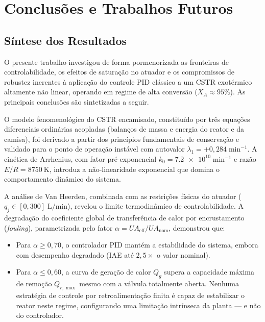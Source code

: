 \chapter{Conclusões e Trabalhos Futuros}
\label{cap:conclusoes}

\section{Síntese dos Resultados}
\label{sec:sintese_resultados}

O presente trabalho investigou de forma pormenorizada as fronteiras de controlabilidade, os efeitos de saturação no atuador e os compromissos de robustez inerentes à aplicação do controle PID clássico a um CSTR exotérmico altamente não linear, operando em regime de alta conversão ($X_A \approx 95\%$). As principais conclusões são sintetizadas a seguir.

O modelo fenomenológico do CSTR encamisado, constituído por três equações diferenciais ordinárias acopladas (balanços de massa e energia do reator e da camisa), foi derivado a partir dos princípios fundamentais de conservação e validado para o ponto de operação instável com autovalor $\lambda_1 = +0{,}284\;\si{\minute^{-1}}$. A cinética de Arrhenius, com fator pré-exponencial $k_0 = \num{7.2e10}\;\si{\minute^{-1}}$ e razão $E/R = \SI{8750}{\kelvin}$, introduz a não-linearidade exponencial que domina o comportamento dinâmico do sistema.

A análise de Van Heerden, combinada com as restrições físicas do atuador ($q_j \in [0, 300]\;\si{\liter\per\minute}$), revelou o limite termodinâmico de controlabilidade. A degradação do coeficiente global de transferência de calor por encrustamento (\textit{fouling}), parametrizada pelo fator $\alpha = UA_{\text{eff}}/UA_{\text{nom}}$, demonstrou que:
\begin{itemize}
    \item Para $\alpha \geq 0{,}70$, o controlador PID mantém a estabilidade do sistema, embora com desempenho degradado (IAE até $2{,}5\times$ o valor nominal).
    \item Para $\alpha \leq 0{,}60$, a curva de geração de calor $Q_g$ supera a capacidade máxima de remoção $Q_{r,\max}$ mesmo com a válvula totalmente aberta. Nenhuma estratégia de controle por retroalimentação finita é capaz de estabilizar o reator neste regime, configurando uma limitação intrínseca da planta --- e não do controlador.
\end{itemize}

